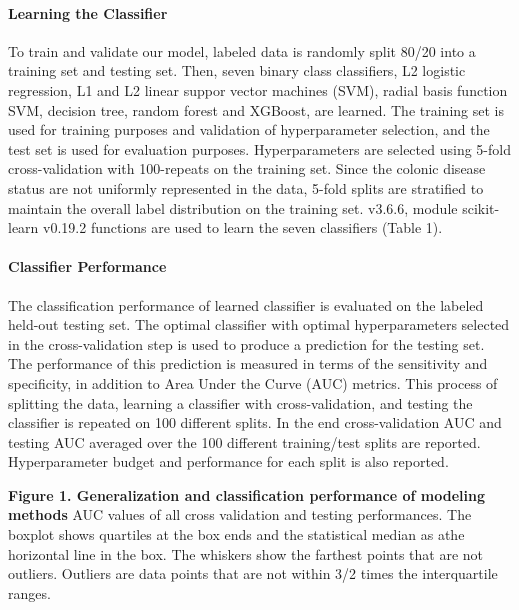 \documentclass[11pt,]{article}
\let\oldparagraph\paragraph
\renewcommand{\paragraph}[1]{\oldparagraph{#1}\mbox{}}
\begin{document}
\paragraph{Learning the Classifier}\label{learning-the-classifier}

To train and validate our model, labeled data is randomly split 80/20
into a training set and testing set. Then, seven binary class
classifiers, L2 logistic regression, L1 and L2 linear suppor vector
machines (SVM), radial basis function SVM, decision tree, random forest
and XGBoost, are learned. The training set is used for training purposes
and validation of hyperparameter selection, and the test set is used for
evaluation purposes. Hyperparameters are selected using 5-fold
cross-validation with 100-repeats on the training set. Since the colonic
disease status are not uniformly represented in the data, 5-fold splits
are stratified to maintain the overall label distribution on the
training set. v3.6.6, module scikit-learn v0.19.2 functions are used to
learn the seven classifiers (Table 1).

\paragraph{Classifier Performance}\label{classifier-performance}

The classification performance of learned classifier is evaluated on the
labeled held-out testing set. The optimal classifier with optimal
hyperparameters selected in the cross-validation step is used to produce
a prediction for the testing set. The performance of this prediction is
measured in terms of the sensitivity and specificity, in addition to
Area Under the Curve (AUC) metrics. This process of splitting the data,
learning a classifier with cross-validation, and testing the classifier
is repeated on 100 different splits. In the end cross-validation AUC and
testing AUC averaged over the 100 different training/test splits are
reported. Hyperparameter budget and performance for each split is also
reported.

\newpage

\textbf{Figure 1. Generalization and classification performance of
modeling methods } AUC values of all cross validation and testing
performances. The boxplot shows quartiles at the box ends and the
statistical median as athe horizontal line in the box. The whiskers show
the farthest points that are not outliers. Outliers are data points that
are not within 3/2 times the interquartile ranges.
\end{document}
